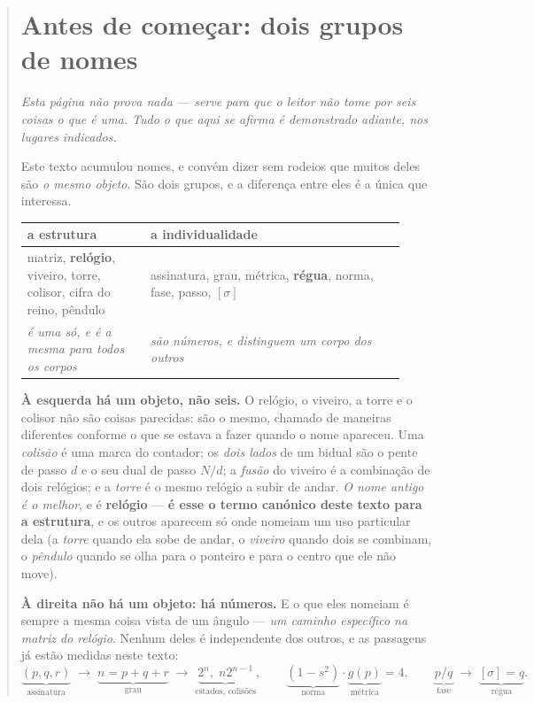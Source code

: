 \documentclass[livro.tex]{subfiles}
\begin{document}
\begin{abstract}
\section*{Antes de começar: dois grupos de nomes}\label{sec:nomes}

\noindent \emph{Esta página não prova nada --- serve para que o leitor não tome por seis coisas
o que é uma. Tudo o que aqui se afirma é demonstrado adiante, nos lugares indicados.}


Este texto acumulou nomes, e convém dizer sem rodeios que muitos deles são \emph{o mesmo objeto}.
São dois grupos, e a diferença entre eles é a única que interessa.

\begin{center}\small
\begin{tabular}{@{}p{0.30\linewidth}p{0.62\linewidth}@{}}
\toprule
\textbf{a estrutura} & \textbf{a individualidade} \\
\midrule
matriz, \textbf{relógio}, viveiro, torre, colisor, cifra do reino, pêndulo
 & assinatura, grau, métrica, \textbf{régua}, norma, fase, passo, $[\sigma]$ \\
\addlinespace
\emph{é uma só, e é a mesma para todos os corpos}
 & \emph{são números, e distinguem um corpo dos outros} \\
\bottomrule
\end{tabular}
\end{center}

\noindent \textbf{À esquerda há um objeto, não seis.} O relógio, o viveiro, a torre e o colisor não
são coisas parecidas: são o mesmo, chamado de maneiras diferentes conforme o que se estava a fazer
quando o nome apareceu. Uma \emph{colisão} é uma marca do contador; os \emph{dois lados} de um
bidual são o pente de passo $d$ e o seu dual de passo $N/d$; a \emph{fusão} do viveiro é a
combinação de dois relógios; e a \emph{torre} é o mesmo relógio a subir de andar. \emph{O nome
antigo é o melhor}, e é \textbf{relógio} --- \textbf{é esse o termo canónico deste texto para a
estrutura}, e os outros aparecem só onde nomeiam um uso particular dela (a \emph{torre} quando ela
sobe de andar, o \emph{viveiro} quando dois se combinam, o \emph{pêndulo} quando se olha para o
ponteiro e para o centro que ele não move).

\medskip
\noindent \textbf{À direita não há um objeto: há números.} E o que eles nomeiam é sempre a mesma
coisa vista de um ângulo --- \emph{um caminho específico na matriz do relógio}. Nenhum deles é
independente dos outros, e as passagens já estão medidas neste texto:
\[
  \underbrace{(p,q,r)}_{\text{assinatura}} \;\to\; \underbrace{n=p+q+r}_{\text{grau}} \;\to\;
  \underbrace{2^n,\; n2^{n-1}}_{\text{estados, colisões}}, \qquad
  \underbrace{(1-s^2)}_{\text{norma}}\cdot\underbrace{g(p)}_{\text{métrica}} = 4, \qquad
  \underbrace{p/q}_{\text{fase}} \;\to\; \underbrace{[\sigma]=q}_{\text{régua}} .
\]


\end{abstract}
\end{document}
